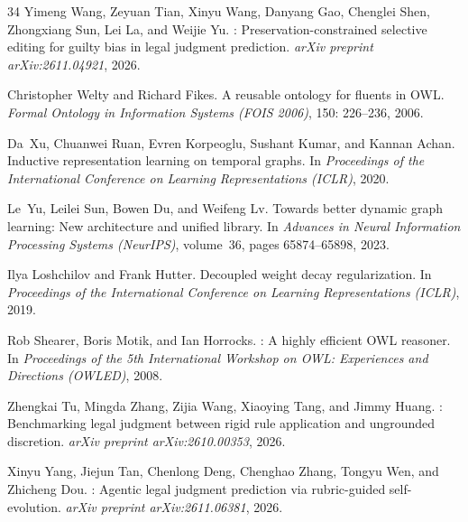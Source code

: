 \documentclass[11pt,a4paper]{article}
\begin{document}
\begin{thebibliography}{34}
Yimeng Wang, Zeyuan Tian, Xinyu Wang, Danyang Gao, Chenglei Shen, Zhongxiang
  Sun, Lei La, and Weijie Yu.
: Preservation-constrained selective editing for guilty bias
  in legal judgment prediction.
\newblock \emph{arXiv preprint arXiv:2611.04921}, 2026.

Christopher Welty and Richard Fikes.
\newblock A reusable ontology for fluents in {OWL}.
\newblock \emph{Formal Ontology in Information Systems (FOIS 2006)},
  150: 226--236, 2006.

Da~Xu, Chuanwei Ruan, Evren Korpeoglu, Sushant Kumar, and Kannan Achan.
\newblock Inductive representation learning on temporal graphs.
\newblock In \emph{Proceedings of the International Conference on Learning
  Representations (ICLR)}, 2020.

Le~Yu, Leilei Sun, Bowen Du, and Weifeng Lv.
\newblock Towards better dynamic graph learning: New architecture and unified
  library.
\newblock In \emph{Advances in Neural Information Processing Systems
  (NeurIPS)}, volume~36, pages 65874--65898, 2023.

Ilya Loshchilov and Frank Hutter.
\newblock Decoupled weight decay regularization.
\newblock In \emph{Proceedings of the International Conference on Learning Representations (ICLR)}, 2019.

Rob Shearer, Boris Motik, and Ian Horrocks.
: A highly efficient {OWL} reasoner.
\newblock In \emph{Proceedings of the 5th International Workshop on OWL: Experiences and Directions (OWLED)}, 2008.

Zhengkai Tu, Mingda Zhang, Zijia Wang, Xiaoying Tang, and Jimmy Huang.
: Benchmarking legal judgment between rigid rule application and ungrounded discretion.
\newblock \emph{arXiv preprint arXiv:2610.00353}, 2026.

Xinyu Yang, Jiejun Tan, Chenlong Deng, Chenghao Zhang, Tongyu Wen, and Zhicheng Dou.
: Agentic legal judgment prediction via rubric-guided self-evolution.
\newblock \emph{arXiv preprint arXiv:2611.06381}, 2026.

\end{thebibliography}
\end{document}

